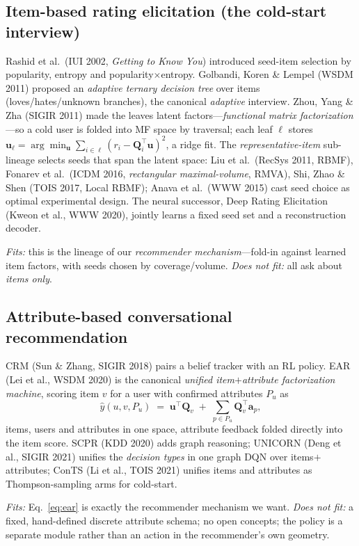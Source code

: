 \documentclass[11pt]{article}
\newcommand{\Q}{\mathbf{Q}}
\newcommand{\uu}{\mathbf{u}}
\begin{document}
\subsection{Item-based rating elicitation (the cold-start interview)}
Rashid et al.\ (IUI 2002, \emph{Getting to Know You}) introduced seed-item selection by popularity, entropy and
popularity$\times$entropy. Golbandi, Koren \& Lempel (WSDM 2011) proposed an \emph{adaptive ternary decision
tree} over items (loves/hates/unknown branches), the canonical \emph{adaptive} interview. Zhou, Yang \& Zha
(SIGIR 2011) made the leaves latent factors---\emph{functional matrix factorization}---so a cold user is folded
into MF space by traversal; each leaf $\ell$ stores $\uu_\ell=\arg\min_\uu\sum_{i\in\ell}(r_i-\Q_i^\top\uu)^2$, a
ridge fit. The \emph{representative-item} sub-lineage selects seeds that span the latent space: Liu et al.\
(RecSys 2011, RBMF), Fonarev et al.\ (ICDM 2016, \emph{rectangular maximal-volume}, RMVA), Shi, Zhao \& Shen
(TOIS 2017, Local RBMF); Anava et al.\ (WWW 2015) cast seed choice as optimal experimental design. The neural
successor, Deep Rating Elicitation (Kweon et al., WWW 2020), jointly learns a fixed seed set and a reconstruction
decoder.

\emph{Fits:} this is the lineage of our \emph{recommender mechanism}---fold-in against learned item factors, with
seeds chosen by coverage/volume. \emph{Does not fit:} all ask about \emph{items only}.

\subsection{Attribute-based conversational recommendation}
CRM (Sun \& Zhang, SIGIR 2018) pairs a belief tracker with an RL policy. EAR (Lei et al., WSDM 2020) is the
canonical \emph{unified item$+$attribute factorization machine}, scoring item $v$ for a user with confirmed
attributes $P_u$ as
\begin{equation}\label{eq:ear}
  \hat y(u,v,P_u) \;=\; \uu^\top \Q_v \;+\; \textstyle\sum_{p\in P_u}\Q_v^\top \mathbf{a}_p,
\end{equation}
items, users and attributes in one space, attribute feedback folded directly into the item score. SCPR (KDD 2020)
adds graph reasoning; UNICORN (Deng et al., SIGIR 2021) unifies the \emph{decision types} in one graph DQN over
items$+$attributes; ConTS (Li et al., TOIS 2021) unifies items and attributes as Thompson-sampling arms for
cold-start.

\emph{Fits:} Eq.~\eqref{eq:ear} is exactly the recommender mechanism we want. \emph{Does not fit:} a fixed,
hand-defined discrete attribute schema; no open concepts; the policy is a separate module rather than an action in
the recommender's own geometry.
\end{document}
